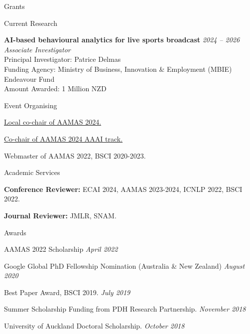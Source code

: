 \documentclass{resume} %
\begin{document}
\begin{rSection}{Grants}
	\begin{rSubsection}{Current Research}{}{}{}
		\item {\bf AI-based behavioural analytics for live sports broadcast} \hfill {\em 2024 -- 2026}\\
			{\em Associate Investigator}\\
			Principal Investigator: Patrice Delmas\\
			Funding Agency: Ministry of Business, Innovation \& Employment (MBIE) Endeavour Fund\\
			Amount Awarded: 1 Million NZD
	\end{rSubsection}
\end{rSection}



\begin{rSection}{Event Organising}
	\begin{rSubsection}{}{}{}{}
		\item \href{https://www.aamas2024-conference.auckland.ac.nz/organization/organizing-committee/}{Local co-chair of AAMAS 2024.}
		\item \href{https://www.aamas2024-conference.auckland.ac.nz/organization/organizing-committee/}{Co-chair of AAMAS 2024 AAAI track.}
		\item Webmaster of AAMAS 2022, BSCI 2020-2023.
	\end{rSubsection}
\end{rSection}

\begin{rSection}{Academic Services}
	\begin{rSubsection}{}{}{}{}
		\item {\bf Conference Reviewer:} ECAI 2024, AAMAS 2023-2024, ICNLP 2022, BSCI 2022.
		\item {\bf Journal Reviewer:} JMLR, SNAM.
	\end{rSubsection}
\end{rSection}


\begin{rSection}{Awards}
\begin{rSubsection}{}{}{}{}
\item AAMAS 2022 Scholarship \hfill {\em April 2022}
\item Google Global PhD Fellowship Nomination (Australia \& New Zealand) \hfill {\em August 2020}
\item Best Paper Award, BSCI 2019. \hfill {\em July 2019}
\item Summer Scholarship Funding from PDH Research Partnership. \hfill {\em November 2018}
\item University of Auckland Doctoral Scholarship. \hfill {\em October 2018}
\end{rSubsection}
\end{rSection}
\end{document}
